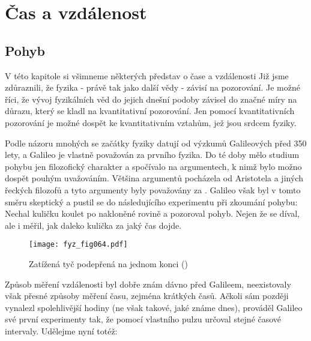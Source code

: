 \chapter{Čas a vzdálenost}\label{chap:fey_cas}
\minitoc
  \section{Pohyb}
    V této kapitole si všimneme některých představ o čase a vzdálenosti Již jsme zdůraznili, že 
    fyzika - právě tak jako další vědy - závisí na pozorování. Je možné říci, že vývoj fyzikálních 
    věd do jejich dnešní podoby závisel do značné míry na důrazu, který se kladl na kvantitativní 
    pozorování. Jen pomocí kvantitativních pozorování je možné dospět ke kvantitativním vztahům, 
    jež jsou srdcem fyziky.
    
    Podle názoru mnohých se začátky fyziky datují od výzkumů Galileových před 350 lety, a Galileo 
    je vlastně považován za prvního fyzika. Do té doby mělo studium pohybu jen filozofický 
    charakter a spočívalo na argumentech, k nimž bylo možno dospět pouhým uvažováním. Většina 
    argumentů pocházela od Aristotela a jiných řeckých filozofů a tyto argumenty byly považovány za 
    . Galileo však byl v tomto směru skeptický a pustil se do následujícího 
    experimentu při zkoumání pohybu: Nechal kuličku koulet po nakloněné rovině a pozoroval pohyb. 
    Nejen že se díval, ale i měřil, jak daleko kulička za jaký čas dojde.
    
    \begin{figure}[ht!]  %
      \centering
      \texttt{[image: fyz\_fig064.pdf]}
      \caption{Zatížená tyč podepřená na jednom konci (\cite[s.~64]{Feynman01})}
      \label{fyz:fig064}
    \end{figure}
    
    Způsob měření vzdálenosti byl dobře znám dávno před Galileem, neexistovaly však přesné způsoby 
    měření času, zejména krátkých časů. Ačkoli sám později vynalezl spolehlivější hodiny (ne však 
    takové, jaké známe dnes), prováděl Galileo své první experimenty tak, že pomocí vlastního 
    pulzu určoval stejné časové intervaly. Udělejme nyní totéž:
    
